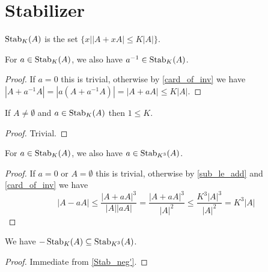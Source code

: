 \chapter{Stabilizer}
\label{chap:stab}

\begin{definition}
    \label{Stab}
    \leanok
    $\operatorname{\operatorname{Stab}}_K(A)$ is the set $\{x | |A + x A| \leq K |A|\}$.
\end{definition}

\begin{lemma}
    \label{Stab_inv'}
    \leanok
    For $a \in \operatorname{\operatorname{Stab}}_K(A)$, we also have $a^{-1} \in \operatorname{\operatorname{Stab}}_K(A)$.
\end{lemma}

\begin{proof}
    \leanok
    If $a = 0$ this is trivial, otherwise by \ref{card_of_inv} we have $|A + a^{-1}A| = |a(A + a^{-1}A)| = |A + a A| \leq K |A|$.
\end{proof}

\begin{lemma}
    \label{one_le_of_mem}
    \leanok
    If $A \neq \emptyset$ and $a \in \operatorname{\operatorname{Stab}}_K(A)$ then $1 \leq K$.
\end{lemma}

\begin{proof}
    \leanok
    Trivial.
\end{proof}

\begin{lemma}
    \label{Stab_neg'}
    \leanok
    For $a \in \operatorname{\operatorname{Stab}}_K(A)$, we also have $a \in \operatorname{\operatorname{Stab}}_{K^3}(A)$.
\end{lemma}

\begin{proof}
    \leanok
    If $a = 0$ or $A = \emptyset$ this is trivial, otherwise by \ref{sub_le_add} and \ref{card_of_inv} we have
    $$|A - a A| \leq \frac{|A + aA|^3}{|A| |a A|} = \frac{|A + aA|^3}{|A|^2} \leq \frac{K^3 |A|^3}{|A|^2} = K^3 |A|$$
\end{proof}

\begin{lemma}
    \label{Stab_neg}
    \leanok
    We have $-\operatorname{\operatorname{Stab}}_{K}(A) \subseteq \operatorname{\operatorname{Stab}}_{K^3}(A)$.
\end{lemma}

\begin{proof}
    \leanok
    Immediate from \ref{Stab_neg'}.
\end{proof}


